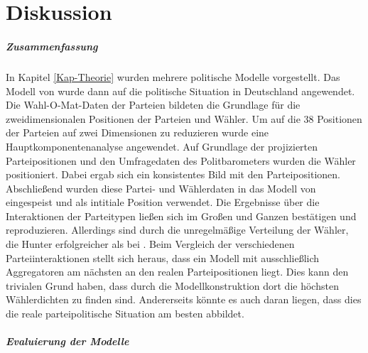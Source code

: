 
\chapter{Diskussion}\label{Kap-Diskussion}

\paragraph{Zusammenfassung}
In Kapitel \ref{Kap-Theorie} wurden mehrere politische Modelle vorgestellt. Das Modell von \citet{laver2005policy} wurde dann auf die politische Situation in Deutschland angewendet. Die Wahl-O-Mat-Daten der Parteien bildeten die Grundlage für die zweidimensionalen Positionen der Parteien und Wähler. Um auf die 38 Positionen der Parteien auf zwei Dimensionen zu reduzieren wurde eine Hauptkomponentenanalyse angewendet. Auf Grundlage der projizierten Parteipositionen und den Umfragedaten des Politbarometers wurden die Wähler positioniert. Dabei ergab sich ein konsistentes Bild mit den Parteipositionen. Abschließend wurden diese Partei- und Wählerdaten in das Modell von \citet{laver2005policy} eingespeist und als intitiale Position verwendet. Die Ergebnisse über die Interaktionen der Parteitypen ließen sich im Großen und Ganzen bestätigen und reproduzieren. Allerdings sind durch die unregelmäßige Verteilung der Wähler, die Hunter erfolgreicher als bei \citet{laver2005policy}. Beim Vergleich der verschiedenen Parteiinteraktionen stellt sich heraus, dass ein Modell mit ausschließlich Aggregatoren am nächsten an den realen Parteipositionen liegt. Dies kann den trivialen Grund haben, dass durch die Modellkonstruktion dort die höchsten Wählerdichten zu finden sind. Andererseits könnte es auch daran liegen, dass dies die reale parteipolitische Situation am besten abbildet.

\paragraph{Evaluierung der Modelle}

